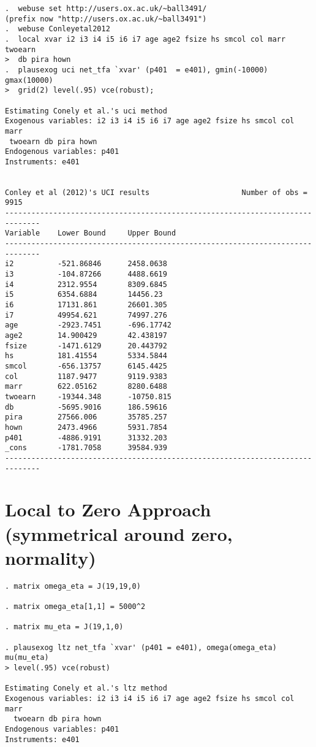 \documentclass{article}[11pt] %
\begin{document}
\begin{spacing}{1}
\begin{verbatim}
.  webuse set http://users.ox.ac.uk/~ball3491/
(prefix now "http://users.ox.ac.uk/~ball3491")
.  webuse Conleyetal2012
.  local xvar i2 i3 i4 i5 i6 i7 age age2 fsize hs smcol col marr twoearn 
>  db pira hown
.  plausexog uci net_tfa `xvar' (p401  = e401), gmin(-10000) gmax(10000) 
>  grid(2) level(.95) vce(robust);

Estimating Conely et al.'s uci method
Exogenous variables: i2 i3 i4 i5 i6 i7 age age2 fsize hs smcol col marr
 twoearn db pira hown
Endogenous variables: p401
Instruments: e401


Conley et al (2012)'s UCI results                     Number of obs =     9915
------------------------------------------------------------------------------
Variable    Lower Bound     Upper Bound
------------------------------------------------------------------------------
i2          -521.86846      2458.0638
i3          -104.87266      4488.6619
i4          2312.9554       8309.6845
i5          6354.6884       14456.23
i6          17131.861       26601.305
i7          49954.621       74997.276
age         -2923.7451      -696.17742
age2        14.900429       42.438197
fsize       -1471.6129      20.443792
hs          181.41554       5334.5844
smcol       -656.13757      6145.4425
col         1187.9477       9119.9383
marr        622.05162       8280.6488
twoearn     -19344.348      -10750.815
db          -5695.9016      186.59616
pira        27566.006       35785.257
hown        2473.4966       5931.7854
p401        -4886.9191      31332.203
_cons       -1781.7058      39584.939
------------------------------------------------------------------------------
\end{verbatim}


\section{Local to Zero Approach (symmetrical around zero, normality)}
\begin{verbatim}
. matrix omega_eta = J(19,19,0)

. matrix omega_eta[1,1] = 5000^2

. matrix mu_eta = J(19,1,0)

. plausexog ltz net_tfa `xvar' (p401 = e401), omega(omega_eta) mu(mu_eta) 
> level(.95) vce(robust)

Estimating Conely et al.'s ltz method
Exogenous variables: i2 i3 i4 i5 i6 i7 age age2 fsize hs smcol col marr 
  twoearn db pira hown
Endogenous variables: p401
Instruments: e401



\end{verbatim}
\end{spacing}
\end{document}
